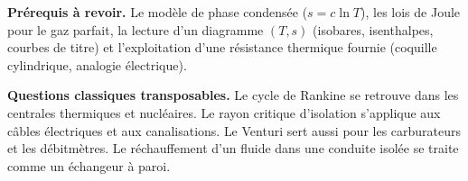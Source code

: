 \documentclass[11pt,a4paper]{article}
\begin{document}
\textbf{Prérequis à revoir.} Le modèle de phase condensée (\(s=c\ln T\)), les lois de Joule pour le gaz parfait, la lecture d'un diagramme \((T,s)\) (isobares, isenthalpes, courbes de titre) et l'exploitation d'une résistance thermique fournie (coquille cylindrique, analogie électrique).

\textbf{Questions classiques transposables.} Le cycle de Rankine se retrouve dans les centrales thermiques et nucléaires. Le rayon critique d'isolation s'applique aux câbles électriques et aux canalisations. Le Venturi sert aussi pour les carburateurs et les débitmètres. Le réchauffement d'un fluide dans une conduite isolée se traite comme un échangeur à paroi.
\end{document}
